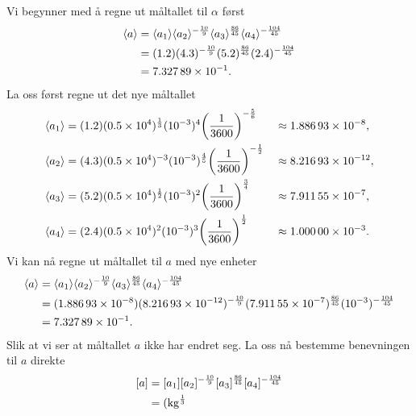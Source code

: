 \documentclass[a4paper,11pt]{article}
\begin{document}
\begin{solution}
    Vi begynner med å regne ut måltallet til $\alpha$ først
    \begin{align*}
         \brak{a} 
      &= \brak{a_1}%
         \brak{a_2}^{-\frac{10}{9}}%
         \brak{a_3}^{\frac{86}{45}}%
         \brak{a_4}^{-\frac{104}{45}} \\ 
      &= (\num{1.2})%
         (\num{4.3})^{-\frac{10}{9}}%
         (\num{5.2})^{\frac{86}{45}}%
         (\num{2.4})^{-\frac{104}{45}} \\
      &= \num{7.32789e-1}.
    \end{align*}
    La oss først regne ut det nye måltallet
    \begin{alignat*}{2}
      \langle a_1\rangle &= (\num{1.2})(\num{0.5e4})^{\frac{1}{3}}
                    (\num{e-3})^4\biggl(\frac{1}{3600}\biggr)^{-\frac{5}{6}} 
        &&\approx \num{1.88693e-8},\\
      \langle a_2\rangle &= (\num{4.3})(\num{0.5e4})^{-3}
                    (\num{e-3})^{\frac{4}{5}}\biggl(\frac{1}{3600}\biggr)^{-\frac{1}{2}} 
      &&\approx \num{8.21693e-12},\\
      \langle a_3\rangle &= (\num{5.2})(\num{0.5e4})^{\frac{1}{2}}
                    (\num{e-3})^2\biggl(\frac{1}{3600}\biggr)^{\frac{3}{4}} 
      &&\approx \num{7.91155e-7},\\
      \langle a_4\rangle &= (\num{2.4})(\num{0.5e4})^{2}
                    (\num{e-3})^3\biggl(\frac{1}{3600}\biggr)^{\frac{1}{2}} 
        &&\approx \num{1.00000e-3}.
    \end{alignat*}
    Vi kan nå regne ut måltallet til $a$ med nye enheter
    \begin{align*}
         \brak{a} 
      &= \brak{a_1}%
         \brak{a_2}^{-\frac{10}{9}}%
         \brak{a_3}^{\frac{86}{45}}%
         \brak{a_4}^{-\frac{104}{45}} \\ 
      &= (\num{1.88693e-8})%
         (\num{8.21693e-12})^{-\frac{10}{9}}%
         (\num{7.91155e-7})^{\frac{86}{45}}%
         (\num{e-3})^{-\frac{104}{45}} \\
      &= \num{7.32789e-1}.
    \end{align*}
    Slik at vi ser at måltallet $a$ ikke har endret seg. La oss nå bestemme
    benevningen til $a$ direkte
    \begin{align*}
         \bpar{a}
      &= \bpar{a_1}%
         \bpar{a_2}^{-\frac{10}{9}}%
         \bpar{a_3}^{\frac{86}{45}}%
         \bpar{a_4}^{-\frac{104}{45}} \\
      &= (\si{\kg\tothe{\frac{1}{3}}%
}
\end{align*}
\end{solution}
\end{document}
